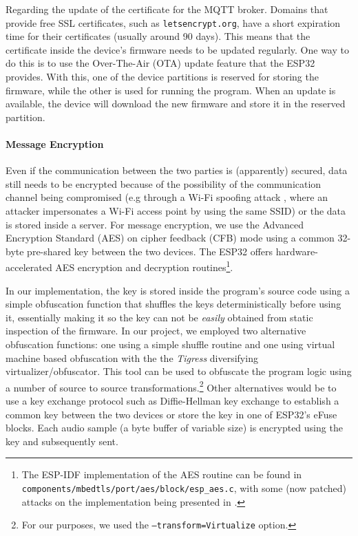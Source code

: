 \documentclass[conference]{IEEEtran}
\begin{document}
Regarding the update of the certificate for the MQTT broker.
Domains that provide free SSL certificates, such as \texttt{letsencrypt.org}, have a short expiration time for their certificates (usually around 90 days).
This means that the certificate inside the device's firmware needs to be updated regularly.
One way to do this is to use the Over-The-Air (OTA) update feature that the ESP32 provides.
With this, one of the device partitions is reserved for storing the firmware, while the other is used for running the program.
When an update is available, the device will download the new firmware and store it in the reserved partition.

\paragraph{Message Encryption}

Even if the communication between the two parties is (apparently) secured, data still needs to be encrypted because of the possibility 
of the communication channel being compromised (e.g through a Wi-Fi spoofing attack \cite{WifiSpoofing}, where an attacker 
impersonates a Wi-Fi access point by using the same SSID) or the data is stored inside a server.
For message encryption, we use the Advanced Encryption Standard (AES) on cipher feedback (CFB) mode using 
a common 32-byte pre-shared key between the two devices.
The ESP32 offers hardware-accelerated AES encryption and decryption routines\footnote{The ESP-IDF implementation of the AES routine can be found in \texttt{components/mbedtls/port/aes/block/esp\_aes.c},
with some (now patched) attacks on the implementation being presented in \cite{PwnEsp32Crypto}.}.

In our implementation, the key is stored inside the program's source code using 
a simple obfuscation function that shuffles the keys deterministically before using it, essentially
making it so the key can not be \textit{easily} obtained from static inspection of the firmware.
In our project, we employed two alternative obfuscation functions: one 
using a simple shuffle routine and one using
virtual machine based obfuscation\cite{VMObfuscation} with the the \textit{Tigress}\cite{Tigress} diversifying virtualizer/obfuscator.
This tool can be used to obfuscate the program logic using 
a number of source to source transformations.\footnote{For our purposes, we used the \texttt{--transform=Virtualize} option.}
Other alternatives would be to use a key exchange protocol such as Diffie-Hellman key exchange\cite{DiffieHellmanKeyExchange} to 
establish a common key between the two devices or store the key in one of ESP32's eFuse blocks.
Each audio sample (a byte buffer of variable size) is encrypted using the key 
and subsequently sent.
\end{document}
